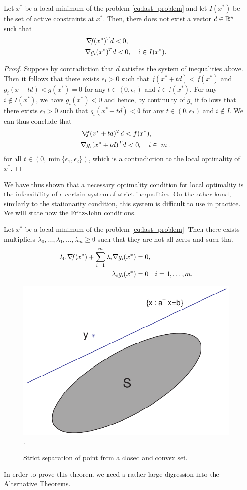 \documentclass[10pt,a4paper]{article}
\begin{document}
\begin{lemma}\label{lemma:for_fritzjohn}
Let $x^*$ be a local minimum of the problem \eqref{eq:last_problem} and let $I(x^*)$ be the set of active constraints at $x^*$. Then, there does not exist a vector $d\in\mathbb{R}^n$ such that 
\begin{align*}
&\operatorname*{\mathit{\nabla \!f}}(x^*)^Td<0,\\
&\nabla g_i (x^*)^Td<0,\quad i \in I(x^*).
\end{align*}
\end{lemma}
\begin{proof}
Suppose by contradiction that $d$ satisfies the system of inequalities above. Then it follows that there exists $\epsilon_1>0$ such that $f(x^*+td)<f(x^*)$ and $g_i(x+td)<g(x^*)=0$ for any $t\in (0,\epsilon_1)$ and $i\in I(x^*)$. For any $i\not \in I(x^*)$, we have $g_i(x^*)<0$ and hence, by continuity of $g_i$ it follows that there exists $\epsilon_2>0$ such that $g_i(x^*+td)<0$ for any $t\in (0,\epsilon_2)$ and $i\not \in I$. We can thus conclude that 
\begin{align*}
&\operatorname*{\mathit{\nabla \!f}}(x^*+td)^Td<f(x^*),\\
&\nabla g_i (x^*+td)^Td<0,\quad i \in [m],
\end{align*}
for all $t\in (0,\min\{\epsilon_1,\epsilon_2\})$, which is a contradiction to the local optimality of $x^*$.
\end{proof}
We have thus shown that a necessary optimality condition for local optimality is the infeasibility of a certain system of strict inequalities. On the other hand, similarly to the stationarity condition, this system is difficult to use in practice. We will state now the Fritz-John conditions.
\begin{theorem}\label{thm:fritzjohn}
Let $x^*$ be a local minimum of the problem \eqref{eq:last_problem}. Then there exists multipliers $\lambda_0,\dots, \lambda_1, \dots, \lambda_m\geq0$ such that they are not all zeros and such that 
\begin{equation}\label{eq:fritzjohn}
\begin{split}
\lambda_0\operatorname*{\mathit{\nabla \!f}}(x^*)+ \sum_{i=1}^{m} \lambda_i \nabla g_i(x^*) &= 0,\\
\lambda_ig_i(x^*)&=0 \quad i=1, \dots, m.
\end{split}
\end{equation}
\end{theorem}
\begin{figure}
	\centering
	\includegraphics[width=0.5\linewidth]{separation}.
	\caption{Strict separation of point from a closed and convex set.} \label{fig:separtation}
\end{figure}
\noindent In order to prove this theorem we need a rather large digression into the Alternative Theorems. 
\end{document}
